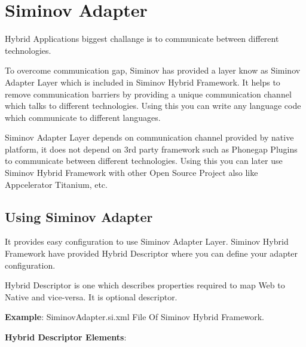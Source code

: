 \newpage
\chapter {\Large{Siminov Adapter}}

Hybrid Applications biggest challange is to communicate between different technologies. 

To overcome communication gap, Siminov has provided a layer know as Siminov Adapter Layer which is included in Siminov Hybrid Framework. It helps to remove communication barriers by providing a unique communication channel which talks to different technologies. Using this you can write any language code which communicate to different languages.

Siminov Adapter Layer depends on communication channel provided by native platform, it does not depend on 3rd party framework such as Phonegap Plugins to communicate between different technologies. Using this you can later use Siminov Hybrid Framework with other Open Source Project also like Appcelerator Titanium, etc.


\section{Using Siminov Adapter}
It provides easy configuration to use Siminov Adapter Layer. Siminov Hybrid Framework have provided Hybrid Descriptor where you can define your adapter configuration.

Hybrid Descriptor is one which describes properties required to map Web to Native and vice-versa. It is optional descriptor.



\textbf{Example}: SiminovAdapter.si.xml File Of Siminov Hybrid Framework.




\textbf{Hybrid Descriptor Elements}: 

